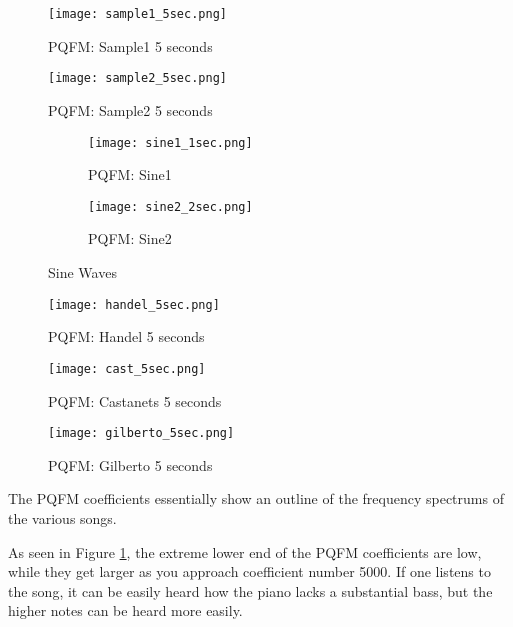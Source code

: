 \documentclass{article} %
\begin{document}

\begin{figure}[H]
\centering
\texttt{[image: sample1\_5sec.png]}
\caption{PQFM: Sample1 5 seconds}
\label{fig:samp1PQFM}
\end{figure}
\begin{figure}[H]
\centering
\texttt{[image: sample2\_5sec.png]}
\caption{PQFM: Sample2 5 seconds}
\label{fig:samp2PQFM}
\end{figure}

\begin{figure}[H]

\begin{subfigure}{0.5\textwidth}
\centering
\texttt{[image: sine1\_1sec.png]}
\caption{PQFM: Sine1}
\label{fig:sin1PQFM}
\end{subfigure}
\begin{subfigure}{0.5\textwidth}
\centering
\texttt{[image: sine2\_2sec.png]}
\caption{PQFM: Sine2}
\label{fig:sin2PQFM}
\end{subfigure}
\caption{Sine Waves}
\end{figure}


\begin{figure}[H]
\centering
\texttt{[image: handel\_5sec.png]}
\caption{PQFM: Handel 5 seconds}
\label{fig:handPQFM}
\end{figure}

\begin{figure}[H]
\centering
\texttt{[image: cast\_5sec.png]}
\caption{PQFM: Castanets 5 seconds}
\label{fig:castPQFM}
\end{figure}


\begin{figure}[H]
\centering
\texttt{[image: gilberto\_5sec.png]}
\caption{PQFM: Gilberto 5 seconds}
\label{fig:gilbPQFM}
\end{figure}


The PQFM coefficients essentially show an outline of the frequency spectrums
of the various songs. 

As seen in Figure \ref{fig:samp1PQFM}, the extreme lower end of the PQFM
coefficients are low, while they get larger as you approach coefficient number
5000. If one listens to the song, it can be easily heard how the piano lacks
a substantial bass, but the higher notes can be heard more easily. 
\end{document}
